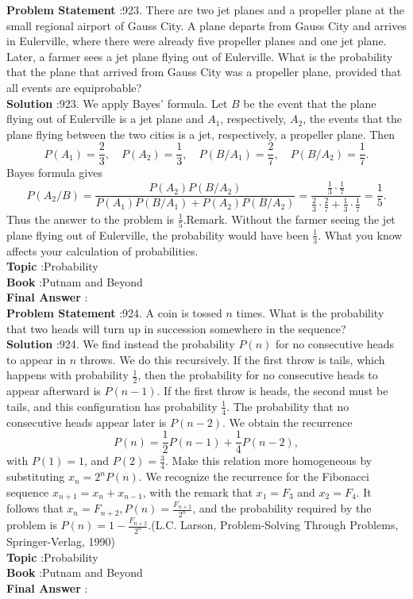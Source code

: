 \documentclass[10pt]{article}
\begin{document}
\textbf{Problem Statement} :923. There are two jet planes and a propeller plane at the small regional airport of Gauss City. A plane departs from Gauss City and arrives in Eulerville, where there were already five propeller planes and one jet plane. Later, a farmer sees a jet plane flying out of Eulerville. What is the probability that the plane that arrived from Gauss City was a propeller plane, provided that all events are equiprobable?\\
\textbf{Solution} :923. We apply Bayes' formula. Let $B$ be the event that the plane flying out of Eulerville is a jet plane and $A_{1}$, respectively, $A_{2}$, the events that the plane flying between the two cities is a jet, respectively, a propeller plane. Then$$ P\left(A_{1}\right)=\frac{2}{3}, \quad P\left(A_{2}\right)=\frac{1}{3}, \quad P\left(B / A_{1}\right)=\frac{2}{7}, \quad P\left(B / A_{2}\right)=\frac{1}{7} . $$Bayes formula gives$$ P\left(A_{2} / B\right)=\frac{P\left(A_{2}\right) P\left(B / A_{2}\right)}{P\left(A_{1}\right) P\left(B / A_{1}\right)+P\left(A_{2}\right) P\left(B / A_{2}\right)}=\frac{\frac{1}{3} \cdot \frac{1}{7}}{\frac{2}{3} \cdot \frac{2}{7}+\frac{1}{3} \cdot \frac{1}{7}}=\frac{1}{5} . $$Thus the answer to the problem is $\frac{1}{5}$.Remark. Without the farmer seeing the jet plane flying out of Eulerville, the probability would have been $\frac{1}{3}$. What you know affects your calculation of probabilities.\\
\textbf{Topic} :Probability\\
\textbf{Book} :Putnam and Beyond\\
\textbf{Final Answer} :\\


\textbf{Problem Statement} :924. A coin is tossed $n$ times. What is the probability that two heads will turn up in succession somewhere in the sequence?\\
\textbf{Solution} :924. We find instead the probability $P(n)$ for no consecutive heads to appear in $n$ throws. We do this recursively. If the first throw is tails, which happens with probability $\frac{1}{2}$, then the probability for no consecutive heads to appear afterward is $P(n-1)$. If the first throw is heads, the second must be tails, and this configuration has probability $\frac{1}{4}$. The probability that no consecutive heads appear later is $P(n-2)$. We obtain the recurrence$$ P(n)=\frac{1}{2} P(n-1)+\frac{1}{4} P(n-2), $$with $P(1)=1$, and $P(2)=\frac{3}{4}$. Make this relation more homogeneous by substituting $x_{n}=2^{n} P(n)$. We recognize the recurrence for the Fibonacci sequence $x_{n+1}=x_{n}+x_{n-1}$, with the remark that $x_{1}=F_{3}$ and $x_{2}=F_{4}$. It follows that $x_{n}=F_{n+2}, P(n)=\frac{F_{n+2}}{2^{n}}$, and the probability required by the problem is $P(n)=1-\frac{F_{n+2}}{2^{n}}$.(L.C. Larson, Problem-Solving Through Problems, Springer-Verlag, 1990)\\
\textbf{Topic} :Probability\\
\textbf{Book} :Putnam and Beyond\\
\textbf{Final Answer} :\\
\end{document}
